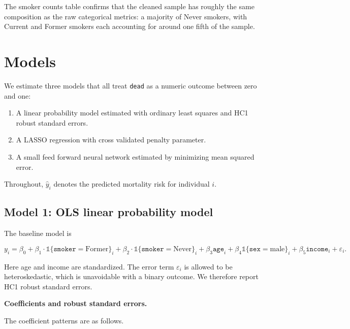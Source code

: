 \documentclass{article}
\begin{document}
The smoker counts table confirms that the cleaned sample has roughly the same composition as the raw categorical metrics: a majority of Never smokers, with Current and Former smokers each accounting for around one fifth of the sample.

\section{Models}

We estimate three models that all treat \texttt{dead} as a numeric outcome between zero and one:

\begin{enumerate}
  \item A linear probability model estimated with ordinary least squares and HC1 robust standard errors.
  \item A LASSO regression with cross validated penalty parameter.
  \item A small feed forward neural network estimated by minimizing mean squared error.
\end{enumerate}

Throughout, \(\hat y_i\) denotes the predicted mortality risk for individual \(i\).

\subsection*{Model 1: OLS linear probability model}

The baseline model is

\[
y_i = \beta_0
    + \beta_1 \cdot \mathbb{1}\{\texttt{smoker}=\text{Former}\}_i
    + \beta_2 \cdot \mathbb{1}\{\texttt{smoker}=\text{Never}\}_i
    + \beta_3 \texttt{age}_i
    + \beta_4 \mathbb{1}\{\texttt{sex}=\text{male}\}_i
    + \beta_5 \texttt{income}_i
    + \varepsilon_i.
\]

Here age and income are standardized. The error term \(\varepsilon_i\) is allowed to be heteroskedastic, which is unavoidable with a binary outcome. We therefore report HC1 robust standard errors.

\medskip
\noindent\textbf{Coefficients and robust standard errors.}
\par


The coefficient patterns are as follows.
\end{document}
